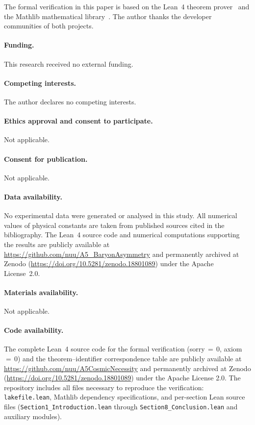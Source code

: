 \documentclass[sn-mathphys-num,Numbered]{sn-jnl}
\theoremstyle{thmstyleone}
\theoremstyle{thmstylethree}
\theoremstyle{thmstyletwo}
\begin{document}
The formal verification in this paper is based on the Lean~4
theorem prover~\cite{Lean4} and the Mathlib mathematical
library~\cite{Mathlib}.
The author thanks the developer communities of both projects.


\paragraph{Funding.}
This research received no external funding.

\paragraph{Competing interests.}
The author declares no competing interests.

\paragraph{Ethics approval and consent to participate.}
Not applicable.

\paragraph{Consent for publication.}
Not applicable.

\paragraph{Data availability.}
No experimental data were generated or analysed in this study.
All numerical values of physical constants are taken from published
sources cited in the bibliography.
The Lean~4 source code and numerical computations supporting the
results are publicly available at
\url{https://github.com/nuu/A5_BaryonAsymmetry}
and permanently archived at Zenodo
(\url{https://doi.org/10.5281/zenodo.18801089})
under the Apache License~2.0.

\paragraph{Materials availability.}
Not applicable.

\paragraph{Code availability.}
The complete Lean~4 source code for the formal verification
(sorry\,$=$\,0, axiom\,$=$\,0) and the theorem--identifier
correspondence table are publicly available at
\url{https://github.com/nuu/A5CosmicNecessity}
and permanently archived at Zenodo
(\url{https://doi.org/10.5281/zenodo.18801089})
under the Apache License 2.0.
The repository includes all files necessary to reproduce
the verification: \texttt{lakefile.lean}, Mathlib dependency
specifications, and per-section Lean source files
(\texttt{Section1\_Introduction.lean} through
\texttt{Section8\_Conclusion.lean} and auxiliary modules).
\end{document}
